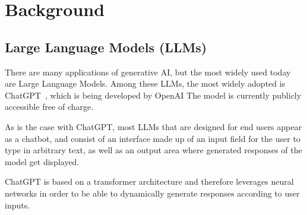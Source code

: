 \section{Background}
\label{sec:background}

\subsection{Large Language Models (LLMs)}
\label{subsec:large-language-models-(llms)}

There are many applications of generative AI, but the most widely used today are Large Language Models.
Among these LLMs, the most widely adopted is ChatGPT~\cite{openai_chatgpt_2023}, which is being developed by OpenAI
The model is currently publicly accessible free of charge. %

As is the case with ChatGPT, most LLMs that are designed for end users appear as a chatbot, and
consist of an interface made up of an input field for the user to type in arbitrary text, as well as
an output area where generated responses of the model get displayed.

ChatGPT is based on a transformer architecture %
and therefore leverages neural networks in order to be able to dynamically generate responses according
to user inputs.

